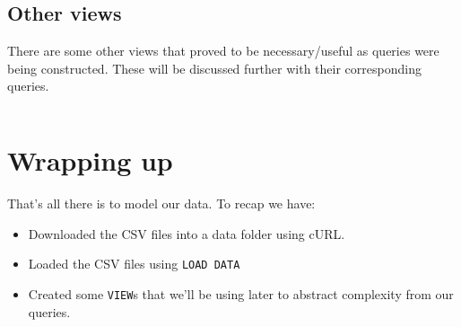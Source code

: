 \documentclass[english,a4paper,]{report}
\providecommand{\tightlist}{%
  \setlength{\itemsep}{0pt}\setlength{\parskip}{0pt}}
\begin{document}
\inputminted[firstline=26,lastline=38]{sql}{src/sql/01-views.sql}

\subsection{Other views}\label{other-views}

There are some other views that proved to be necessary/useful as queries
were being constructed. These will be discussed further with their
corresponding queries.

\inputminted[firstline=41]{sql}{src/sql/01-views.sql}

\section{Wrapping up}\label{wrapping-up-1}

That's all there is to model our data. To recap we have:

\begin{itemize}
\tightlist
\item
  Downloaded the CSV files into a data folder using cURL.
\item
  Loaded the CSV files using \texttt{LOAD\ DATA}
\item
  Created some \texttt{VIEW}s that we'll be using later to abstract
  complexity from our queries.
\end{itemize}
\end{document}
